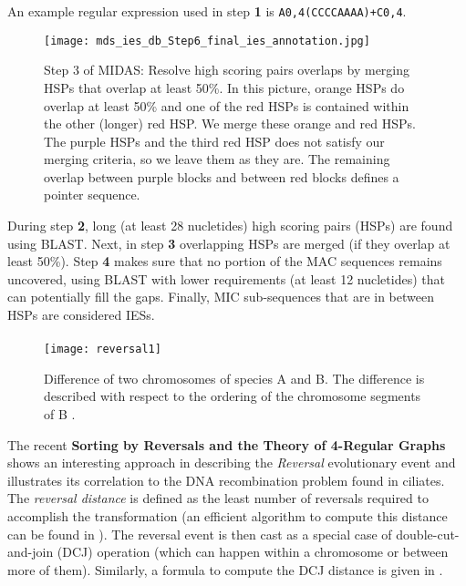 An example regular expression used in step \textbf{1} is \texttt{A{0,4}(CCCCAAAA)+C{0,4}}.
\begin{figure}[h]
  \centering
    \texttt{[image: mds\_ies\_db\_Step6\_final\_ies\_annotation.jpg]}
  \caption{Step 3 of MIDAS: Resolve high scoring pairs overlaps by merging HSPs that overlap at least 50\%. In this picture, orange HSPs do overlap at least 50\% and one of the red HSPs is contained within the other (longer) red HSP. We merge these orange and red HSPs. The purple HSPs and the third red HSP does not satisfy our merging criteria, so we leave them as they are. The remaining overlap between purple blocks and between red blocks defines a pointer sequence. \cite{midas}}

\end{figure}
\clearpage
During step \textbf{2}, long (at least 28 nucletides) high scoring pairs (HSPs) are found using BLAST. Next, in step \textbf{3} overlapping HSPs are merged (if they overlap at least 50\%).
Step \textbf{4} makes sure that no portion of the MAC sequences remains uncovered, using BLAST with lower requirements (at least 12 nucletides) that can potentially fill the gaps.
Finally, MIC sub-sequences that are in between HSPs are considered IESs.

\paragraph{}
\begin{figure}[h]

  \centering
    \texttt{[image: reversal1]}

  \caption{ Difference of two chromosomes of species A and B. The difference is described with respect to the ordering of the chromosome segments of B \cite{DBLP:journals/corr/Brijder17}.}
  \label{fig:reversal1}

\end{figure}
The recent \textbf{Sorting by Reversals and the Theory of 4-Regular Graphs} \cite{DBLP:journals/corr/Brijder17} shows an interesting approach in describing the \textit{Reversal} evolutionary event and illustrates its correlation to the DNA recombination problem found in ciliates. The \textit{reversal distance} is defined as the least number of reversals required to accomplish the transformation (an efficient algorithm to compute this distance can be found in \cite{Hannenhalli}). The reversal event is then cast as a special case of double-cut-and-join (DCJ) operation (which can happen within a chromosome or between more of them). Similarly, a formula to compute the DCJ distance is given in \cite{Bergeron2006}.


